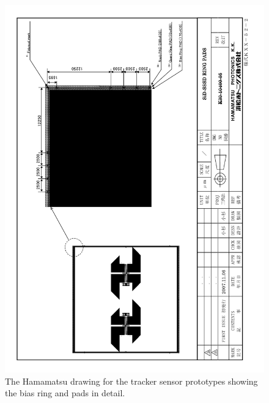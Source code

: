 \documentclass[prc,12pt,nofootinbib,letterpaper]{revtex4}
\begin{document}
\begin{figure}[p]
\begin{center}
    \includegraphics[width=6in]{figures/SiD-SSSD RINGPADS}
\caption{The Hamamatsu drawing for the tracker sensor prototypes showing the bias ring and pads in detail.}
\label{fig:drawing-ringpads}
\end{center}
\end{figure}
\end{document}
